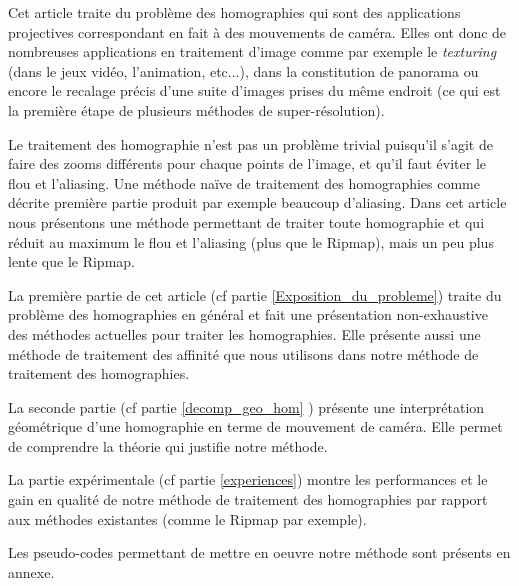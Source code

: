	Cet article traite du problème des homographies qui sont des applications projectives correspondant en fait à des mouvements de caméra. Elles ont donc de nombreuses applications en traitement d'image comme par exemple le \emph{texturing} (dans le jeux vidéo, l'animation, etc...), dans la constitution de panorama \cite{brown2007automatic} ou encore le recalage précis d'une suite d'images prises du même endroit (ce qui est la première étape de plusieurs méthodes de super-résolution).

	Le traitement des homographie n'est pas un problème trivial puisqu'il s'agit de faire des zooms différents pour chaque points de l'image, et qu'il faut éviter le flou et l'aliasing. Une méthode naïve de traitement des homographies comme décrite première partie produit par exemple beaucoup d'aliasing. Dans cet article nous présentons une méthode permettant de traiter toute homographie et qui réduit au maximum le flou et l'aliasing (plus que le Ripmap), mais un peu plus lente que le Ripmap.

	La première partie de cet article (cf partie \ref{Exposition_du_probleme}) traite du problème des homographies en général et fait une présentation non-exhaustive des méthodes actuelles pour traiter les homographies. Elle présente aussi une méthode de traitement des affinité que nous utilisons dans notre méthode de traitement des homographies. 

	La seconde partie (cf partie \ref{decomp_geo_hom} ) présente une interprétation géométrique d'une homographie en terme de mouvement de caméra. Elle permet de comprendre la théorie qui justifie notre méthode.

	La partie expérimentale (cf partie \ref{experiences}) montre les performances et le gain en qualité de notre méthode de traitement des homographies par rapport aux méthodes existantes (comme le Ripmap par exemple).

	Les pseudo-codes permettant de mettre en oeuvre notre méthode sont présents en annexe.
